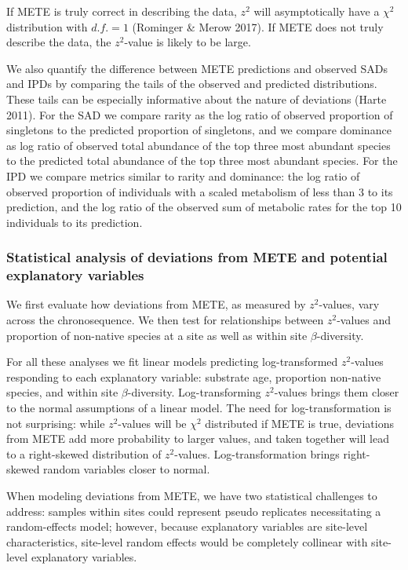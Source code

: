 \documentclass[
  letterpaper,
  DIV=11,
  numbers=noendperiod]{scrartcl}
\begin{document}
If METE is truly correct in describing the data, \(z^2\) will
asymptotically have a \(\chi^2\) distribution with \(d.f. = 1\)
(Rominger \& Merow 2017). If METE does not truly describe the data, the
\(z^2\)-value is likely to be large.

We also quantify the difference between METE predictions and observed
SADs and IPDs by comparing the tails of the observed and predicted
distributions. These tails can be especially informative about the
nature of deviations (Harte 2011). For the SAD we compare rarity as the
log ratio of observed proportion of singletons to the predicted
proportion of singletons, and we compare dominance as log ratio of
observed total abundance of the top three most abundant species to the
predicted total abundance of the top three most abundant species. For
the IPD we compare metrics similar to rarity and dominance: the log
ratio of observed proportion of individuals with a scaled metabolism of
less than 3 to its prediction, and the log ratio of the observed sum of
metabolic rates for the top 10 individuals to its prediction.

\subsubsection{Statistical analysis of deviations from METE and
potential explanatory
variables}\label{statistical-analysis-of-deviations-from-mete-and-potential-explanatory-variables}

We first evaluate how deviations from METE, as measured by
\(z^2\)-values, vary across the chronosequence. We then test for
relationships between \(z^2\)-values and proportion of non-native
species at a site as well as within site \(\beta\)-diversity.

For all these analyses we fit linear models predicting log-transformed
\(z^2\)-values responding to each explanatory variable: substrate age,
proportion non-native species, and within site \(\beta\)-diversity.
Log-transforming \(z^2\)-values brings them closer to the normal
assumptions of a linear model. The need for log-transformation is not
surprising: while \(z^2\)-values will be \(\chi^2\) distributed if METE
is true, deviations from METE add more probability to larger values, and
taken together will lead to a right-skewed distribution of
\(z^2\)-values. Log-transformation brings right-skewed random variables
closer to normal.

When modeling deviations from METE, we have two statistical challenges
to address: samples within sites could represent pseudo replicates
necessitating a random-effects model; however, because explanatory
variables are site-level characteristics, site-level random effects
would be completely collinear with site-level explanatory variables.
\end{document}
